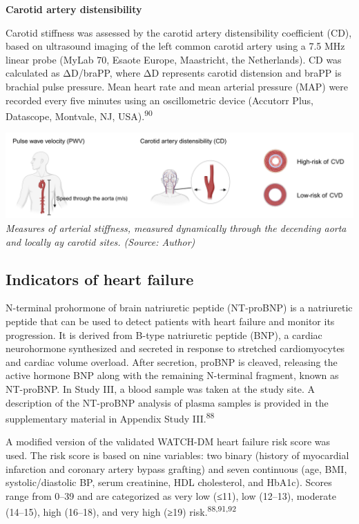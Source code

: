 \documentclass[
  letterpaper,
  headsepline=true,
  open=any]{scrbook}
\begin{document}
\textbf{Carotid artery distensibility}

Carotid stiffness was assessed by the carotid artery distensibility
coefficient (CD), based on ultrasound imaging of the left common carotid
artery using a 7.5 MHz linear probe (MyLab 70, Esaote Europe,
Maastricht, the Netherlands). CD was calculated as ΔD/braPP, where ΔD
represents carotid distension and braPP is brachial pulse pressure. Mean
heart rate and mean arterial pressure (MAP) were recorded every five
minutes using an oscillometric device (Accutorr Plus, Datascope,
Montvale, NJ, USA).\textsuperscript{90}

\includegraphics{images/Methods_arterial_stiffness.pdf} \emph{Measures
of arterial stiffness, measured dynamically through the decending aorta
and locally ay carotid sites. (Source: Author)}

\hypertarget{indicators-of-heart-failure}{%
\subsection{Indicators of heart
failure}\label{indicators-of-heart-failure}}

N-terminal prohormone of brain natriuretic peptide (NT-proBNP) is a
natriuretic peptide that can be used to detect patients with heart
failure and monitor its progression. It is derived from B-type
natriuretic peptide (BNP), a cardiac neurohormone synthesized and
secreted in response to stretched cardiomyocytes and cardiac volume
overload. After secretion, proBNP is cleaved, releasing the active
hormone BNP along with the remaining N-terminal fragment, known as
NT-proBNP. In Study III, a blood sample was taken at the study site. A
description of the NT-proBNP analysis of plasma samples is provided in
the supplementary material in Appendix Study III.\textsuperscript{88}

A modified version of the validated WATCH-DM heart failure risk score
was used. The risk score is based on nine variables: two binary (history
of myocardial infarction and coronary artery bypass grafting) and seven
continuous (age, BMI, systolic/diastolic BP, serum creatinine, HDL
cholesterol, and HbA1c). Scores range from 0--39 and are categorized as
very low (≤11), low (12--13), moderate (14--15), high (16--18), and very
high (≥19) risk.\textsuperscript{88,91,92}
\end{document}
